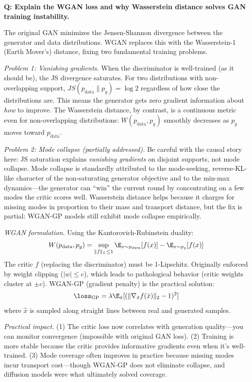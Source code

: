 \begin{interviewq}
\textbf{Q: Explain the WGAN loss and why Wasserstein distance solves GAN training instability.}

 \quad {} \quad \badgefreq{\freqmed}

\stronganswer The original GAN minimizes the Jensen-Shannon divergence between the generator and data distributions. WGAN replaces this with the Wasserstein-1 (Earth Mover's) distance, fixing two fundamental training problems.

\textit{Problem 1: Vanishing gradients.} When the discriminator is well-trained (as it should be), the JS divergence saturates. For two distributions with non-overlapping support, $JS(p_{\text{data}} \| p_g) = \log 2$ regardless of how close the distributions are. This means the generator gets zero gradient information about \textit{how} to improve. The Wasserstein distance, by contrast, is a continuous metric even for non-overlapping distributions: $W(p_{\text{data}}, p_g)$ smoothly decreases as $p_g$ moves toward $p_{\text{data}}$.

\textit{Problem 2: Mode collapse (partially addressed).} Be careful with the causal story here: JS saturation explains \textit{vanishing gradients} on disjoint supports, not mode collapse. Mode collapse is standardly attributed to the mode-seeking, reverse-KL-like character of the non-saturating generator objective and to the min-max dynamics---the generator can ``win'' the current round by concentrating on a few modes the critic scores well. Wasserstein distance helps because it charges for missing modes in proportion to their mass and transport distance, but the fix is partial: WGAN-GP models still exhibit mode collapse empirically.

\textit{WGAN formulation.} Using the Kantorovich-Rubinstein duality:
$$W(p_{\text{data}}, p_g) = \sup_{\|f\|_L \leq 1} \E_{x \sim p_{\text{data}}}[f(x)] - \E_{x \sim p_g}[f(x)]$$
The critic $f$ (replacing the discriminator) must be 1-Lipschitz. Originally enforced by weight clipping ($|w| \leq c$), which leads to pathological behavior (critic weights cluster at $\pm c$). WGAN-GP (gradient penalty) is the practical solution:
$$\loss_{\text{GP}} = \lambda \E_{\hat{x}}[(\|\nabla_{\hat{x}} f(\hat{x})\|_2 - 1)^2]$$
where $\hat{x}$ is sampled along straight lines between real and generated samples.

\textit{Practical impact.} (1) The critic loss now correlates with generation quality---you can monitor convergence (impossible with original GAN loss). (2) Training is more stable because the critic provides informative gradients even when it's well-trained. (3) Mode coverage often improves in practice because missing modes incur transport cost---though WGAN-GP does not eliminate collapse, and diffusion models were what ultimately solved coverage.


\end{interviewq}
